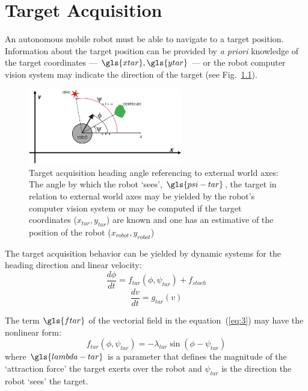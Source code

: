 \chapter{Target Acquisition}%
\label{ch:target-acquisition}
An autonomous mobile robot must be able to navigate to a target
position. Information about the target position can be provided by \textit{a
  priori} knowledge of the target coordinates --- $\gls{xtar}, \gls{ytar}$ --- or the
robot computer vision system may indicate the direction of the target (see
Fig.~\ref{fig:fig1}).
%
\begin{figure}[!hbt]
\centering
    \includegraphics[width=0.6\textwidth]{./img/fig1.png}
  \caption[Target acquisition heading angle referencing to external world
  axes]{Target acquisition heading angle referencing to external world axes: The angle by which the robot `sees', $\gls{psi-tar}$, the target in
    relation to external world axes may be yielded by the robot's computer
    vision system or may be computed if the target coordinates ($x_{tar},
    y_{tar}$) are known and one has an estimative of the position of the robot
    ($x_{robot}, y_{robot}$)}%
\label{fig:fig1}
\end{figure}

The target acquisition behavior can be yielded by dynamic systems for the
heading direction and linear velocity:
%
\begin{equation}
  \label{eq:3}
  \frac{d \phi}{dt} = f_{tar}(\phi{,} \psi _{tar}) + f_{stoch}
\end{equation}
\begin{equation}
  \label{eq:4}
\frac{dv}{dt} = g_{tar} (v)
\end{equation}

The term $\gls{ftar}$ of the vectorial field in the equation~(\ref{eq:3}) may have
the nonlinear form:
\begin{equation}
  \label{eq:5}
f_{tar}(\phi{,} \psi _{tar}) = - \lambda _{tar} \sin (\phi - \psi _{tar})
\end{equation}
%
where $\gls{lambda-tar}$ is a parameter that defines the magnitude of the
`attraction force' the target exerts over the robot and $\psi _{tar}$ is the
direction the robot `sees' the target.

